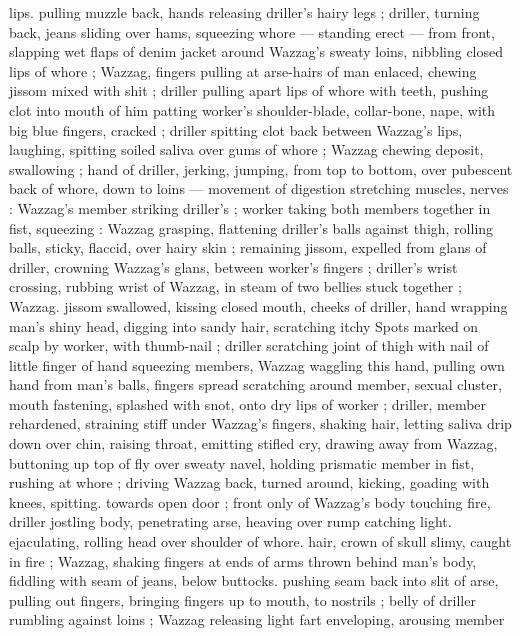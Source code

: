 lips. pulling muzzle back, hands releasing driller's hairy legs ; driller, 
turning back, jeans sliding over hams, squeezing whore --- standing 
erect --- from front, slapping wet flaps of denim jacket around 
Wazzag's sweaty loins, nibbling closed lips of whore ; Wazzag, 
fingers pulling at arse-hairs of man enlaced, chewing jissom mixed 
with shit ; driller pulling apart lips of whore with teeth, pushing clot 
into mouth of him patting worker's shoulder-blade, collar-bone, 
nape, with big blue fingers, cracked ; driller spitting clot back 
between Wazzag's lips, laughing, spitting soiled saliva over gums of 
whore ; Wazzag chewing deposit, swallowing ; hand of driller, jerking, 
jumping, from top to bottom, over pubescent back of whore, down to 
loins --- movement of digestion stretching muscles, nerves : 
Wazzag's member striking driller's ; worker taking both members 
together in fist, squeezing : Wazzag grasping, flattening driller's 
balls against thigh, rolling balls, sticky, flaccid, over hairy skin ; 
remaining jissom, expelled from glans of driller, crowning Wazzag's 
glans, between worker's fingers ; driller's wrist crossing, rubbing 
wrist of Wazzag, in steam of two bellies stuck together ; Wazzag. 
jissom swallowed, kissing closed mouth, cheeks of driller, hand 
wrapping man's shiny head, digging into sandy hair, scratching itchy 
Spots marked on scalp by worker, with thumb-nail ; driller scratching 
joint of thigh with nail of little finger of hand squeezing members, 
Wazzag waggling this hand, pulling own hand from man's balls, 
fingers spread scratching around member, sexual cluster, mouth 
fastening, splashed with snot, onto dry lips of worker ; driller, 
member rehardened, straining stiff under Wazzag's fingers, shaking 
hair, letting saliva drip down over chin, raising throat, emitting stifled 
cry, drawing away from Wazzag, buttoning up top of fly over sweaty 
navel, holding prismatic member in fist, rushing at whore ; driving 
Wazzag back, turned around, kicking, goading with knees, spitting. 
towards open door ; front only of Wazzag's body touching fire, driller 
jostling body, penetrating arse, heaving over rump catching light. 
ejaculating, rolling head over shoulder of whore. hair, crown of skull 
slimy, caught in fire ; Wazzag, shaking fingers at ends of arms thrown 
behind man's body, fiddling with seam of jeans, below buttocks. 
pushing seam back into slit of arse, pulling out fingers, bringing 
fingers up to mouth, to nostrils ; belly of driller rumbling against 
loins ; Wazzag releasing light fart enveloping, arousing member 
